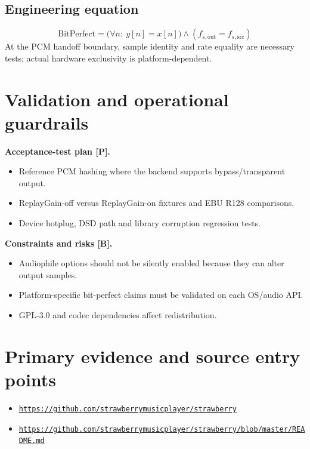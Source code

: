 \documentclass[10pt,a4paper,oneside]{report}
\newcommand{\sourceurl}[1]{\href{#1}{\texttt{\nolinkurl{#1}}}}
\begin{document}
\subsection*{Engineering equation}
\begin{equation*}\mathrm{BitPerfect}=\bigl(\forall n:\ y[n]=x[n]\bigr)\land(f_{s,\mathrm{out}}=f_{s,\mathrm{src}})\end{equation*}
At the PCM handoff boundary, sample identity and rate equality are necessary tests; actual hardware exclusivity is platform-dependent.\par
\section{Validation and operational guardrails}
\textbf{Acceptance-test plan [P].}\par
\begin{itemize}[leftmargin=*,itemsep=2pt,topsep=3pt]
\item Reference PCM hashing where the backend supports bypass/transparent output.
\item ReplayGain-off versus ReplayGain-on fixtures and EBU R128 comparisons.
\item Device hotplug, DSD path and library corruption regression tests.
\end{itemize}
\textbf{Constraints and risks [B].}\par
\begin{itemize}[leftmargin=*,itemsep=2pt,topsep=3pt]
\item Audiophile options should not be silently enabled because they can alter output samples.
\item Platform-specific bit-perfect claims must be validated on each OS/audio API.
\item GPL-3.0 and codec dependencies affect redistribution.
\end{itemize}
\section*{Primary evidence and source entry points}
\begin{itemize}[leftmargin=*,itemsep=1pt,topsep=1pt]
\item \sourceurl{https://github.com/strawberrymusicplayer/strawberry}
\item \sourceurl{https://github.com/strawberrymusicplayer/strawberry/blob/master/README.md}
\end{itemize}
\clearpage
\end{document}
